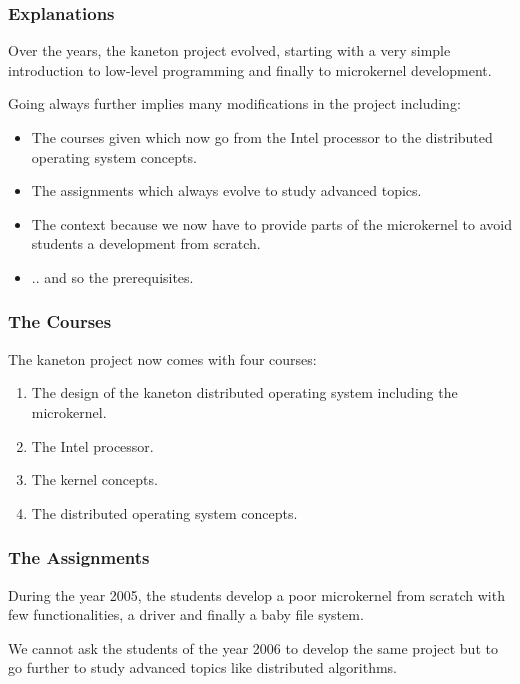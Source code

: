 {%

\begin{frame}
  \frametitle{Explanations}

  Over the years, the kaneton project evolved, starting with a very
  simple introduction to low-level programming and finally
  to microkernel development.

  \nl

  Going always further implies many modifications in the project
  including:

  \begin{itemize}[<+->]
    \item
      The courses given which now go from the Intel processor to
      the distributed operating system concepts.
    \item
      The assignments which always evolve to study advanced topics.
    \item
      The context because we now have to provide parts of the microkernel
      to avoid students a development from scratch.
    \item
      .. and so the prerequisites.
  \end{itemize}
\end{frame}


\begin{frame}
  \frametitle{The Courses}

  The kaneton project now comes with four courses:

  \begin{enumerate}
    \item
      The design of the kaneton distributed operating system including
      the microkernel.
    \item
      The Intel processor.
    \item
      The kernel concepts.
    \item
      The distributed operating system concepts.
  \end{enumerate}
\end{frame}


\begin{frame}
  \frametitle{The Assignments}

  During the year 2005, the students develop a poor microkernel
  from scratch with few functionalities, a driver and finally a baby
  file system.

  \nl

  We cannot ask the students of the year 2006 to develop the same project
  but to go further to study advanced topics like distributed algorithms.


\end{frame}}
